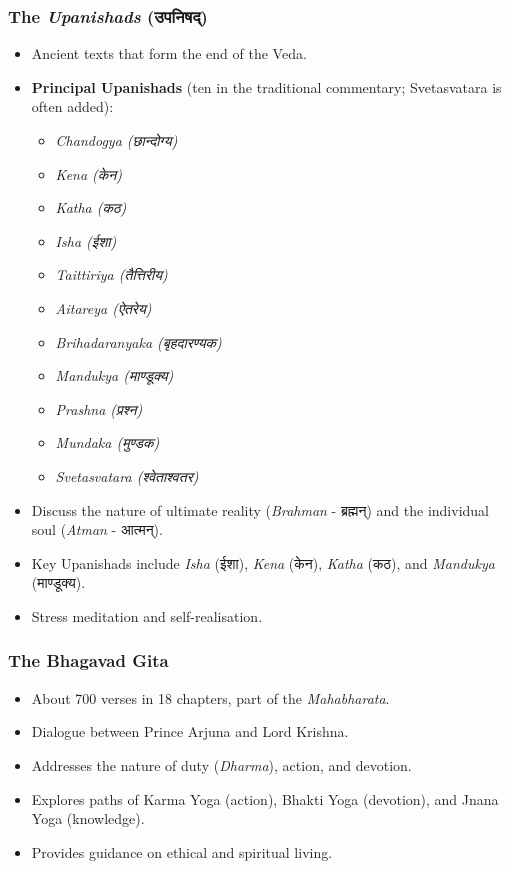 
\begin{frame}[fragile]\frametitle{The \textit{Upanishads} (उपनिषद्)}

      \begin{itemize}
		\item Ancient texts that form the end of the Veda.
        \item \textbf{Principal Upanishads} (ten in the traditional commentary; Svetasvatara is often added):
        \begin{itemize}
            \item \textit{Chandogya (छान्दोग्य)}
            \item \textit{Kena (केन)}
            \item \textit{Katha (कठ)}
            \item \textit{Isha (ईशा)}
            \item \textit{Taittiriya (तैत्तिरीय)}
            \item \textit{Aitareya (ऐतरेय)}
            \item \textit{Brihadaranyaka (बृहदारण्यक)}
            \item \textit{Mandukya (माण्डूक्य)}
            \item \textit{Prashna (प्रश्न)}
            \item \textit{Mundaka (मुण्डक)}
            \item \textit{Svetasvatara (श्वेताश्वतर)}
        \end{itemize}		
		\item Discuss the nature of ultimate reality (\textit{Brahman} - ब्रह्मन्) and the individual soul (\textit{Atman} - आत्मन्).
		\item Key Upanishads include \textit{Isha} (ईशा), \textit{Kena} (केन), \textit{Katha} (कठ), and \textit{Mandukya} (माण्डूक्य).
		\item Stress meditation and self-realisation.
	  \end{itemize}

\end{frame}


\begin{frame}[fragile]\frametitle{The Bhagavad Gita}

      \begin{itemize}
		\item About 700 verses in 18 chapters, part of the \textit{Mahabharata}.
		\item Dialogue between Prince Arjuna and Lord Krishna.
		\item Addresses the nature of duty (\textit{Dharma}), action, and devotion.
		\item Explores paths of Karma Yoga (action), Bhakti Yoga (devotion), and Jnana Yoga (knowledge).
		\item Provides guidance on ethical and spiritual living.
	  \end{itemize}

\end{frame}

